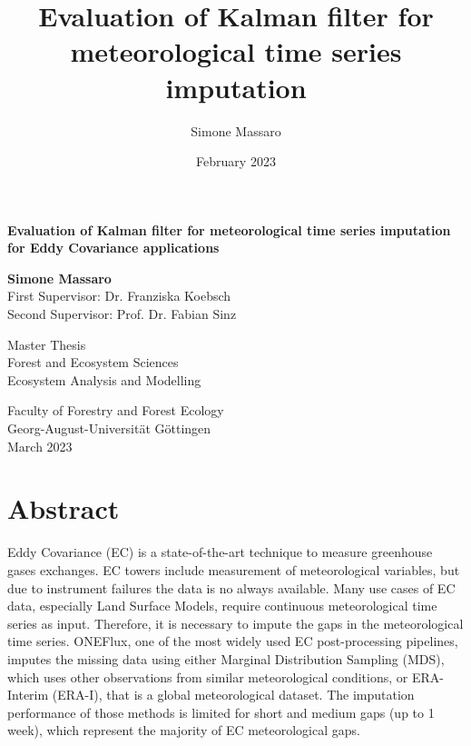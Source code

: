 \documentclass{article}
\title{Evaluation of Kalman filter for meteorological time series imputation}
\author{Simone Massaro}
\date{February 2023}
\let\Oldsection\section
\renewcommand{\section}{\FloatBarrier\Oldsection}
\begin{document}
\newcommand{\vv}[1]{\texttt{#1}}

\begin{titlepage}
    \begin{center}
        \vspace*{1cm}
            
        \Huge
        \textbf{Evaluation of Kalman filter for meteorological time series imputation for Eddy Covariance applications}
            
        \vspace{0.5cm}
        \LARGE
            
        \vspace{1.5cm}
            
        \textbf{Simone Massaro} \\
        \vspace{1cm}
        First Supervisor: Dr. Franziska Koebsch\\
        Second Supervisor: Prof. Dr. Fabian Sinz 
        \vfill
            
        Master Thesis\\
        Forest and Ecosystem Sciences\\
        Ecosystem Analysis and Modelling
            
        \vspace{0.8cm}
            
        \Large
        Faculty of Forestry and Forest Ecology \\
        Georg-August-Universität Göttingen \\
        \vspace{0.3cm}
        March 2023
            
    \end{center}
\end{titlepage}
\clearpage
\tableofcontents
\clearpage

\section*{Abstract}

Eddy Covariance (EC) is a state-of-the-art technique to measure greenhouse gases exchanges. EC towers include measurement of meteorological variables, but due to instrument failures the data is no always available. Many use cases of EC data, especially Land Surface Models, require continuous meteorological time series as input. Therefore, it is necessary to impute the gaps in the meteorological time series. ONEFlux, one of the most widely used EC post-processing pipelines, imputes the missing data using either Marginal Distribution Sampling (MDS), which uses other observations from similar meteorological conditions, or ERA-Interim (ERA-I), that is a global meteorological dataset. The imputation performance of those methods is limited for short and medium gaps (up to 1 week), which represent the majority of EC meteorological gaps.
\end{document}
